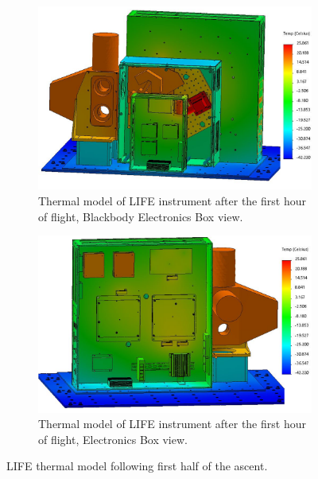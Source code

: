 \begin{figure}
    \centering
    \begin{subfigure}[h]{0.9\textwidth}
        \centering
        \includegraphics[width=\textwidth]{chap4_images/ascent_images/ascent_pt1/Test_30_BBEbox_FIXED.png}
        \caption{Thermal model of LIFE instrument after the first hour of flight, Blackbody Electronics Box view.}
        \label{fig:ascent_pt1_model_bbebox}
    \end{subfigure}
    \begin{subfigure}[h]{0.9\textwidth}
        \centering
        \includegraphics[width=\textwidth]{chap4_images/ascent_images/ascent_pt1/Test_30_Ebox_FIXED.png}
        \caption{Thermal model of LIFE instrument after the first hour of flight, Electronics Box view.}
        \label{fig:ascent_pt1_model_ebox}
    \end{subfigure}
    \caption{LIFE thermal model following first half of the ascent.}
    \label{ascent_pt1_model}
\end{figure}


